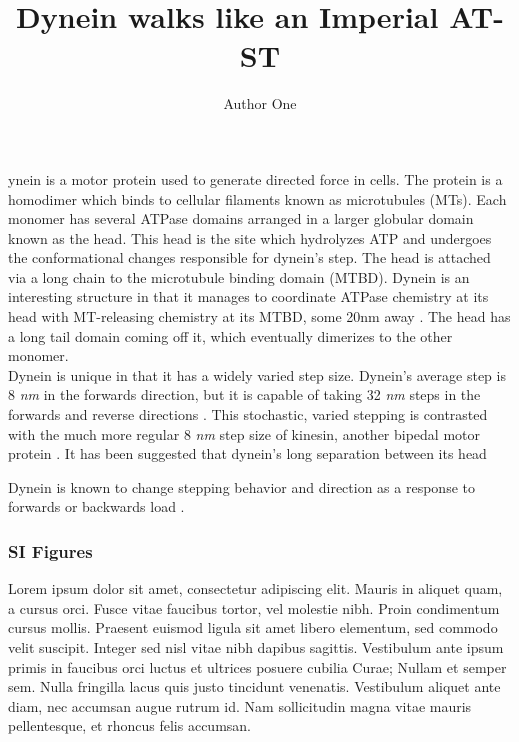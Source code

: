 \documentclass[9pt,twocolumn,twoside,lineno]{pnas-new}
\title{Dynein walks like an Imperial AT-ST}
\author[a,c,1]{Author One}
\affil[a]{Oregon State University}
\begin{document}
\verticaladjustment{-2pt}

\maketitle
\thispagestyle{firststyle}

ynein is a motor protein used to generate directed force in cells. The protein is a homodimer which binds to cellular filaments known as microtubules (MTs). Each monomer has several ATPase domains arranged in a larger globular domain known as the head. This head is the site which hydrolyzes ATP and undergoes the conformational changes responsible for dynein's step. The head is attached via a long chain to the microtubule binding domain (MTBD). Dynein is an interesting structure in that it manages to coordinate ATPase chemistry at its head with MT-releasing chemistry at its MTBD, some 20nm away \cite{mt-atp-coupling}. The head has a long tail domain coming off it, which eventually dimerizes to the other monomer.\\

Dynein is unique in that it has a widely varied step size. Dynein's average step is 8 \textit{nm} in the forwards direction, but it is capable of taking 32 \textit{nm} steps in the forwards and reverse directions \cite{weihongpaper} \cite{yildizpaper}. This stochastic, varied stepping is contrasted with the much more regular 8 \textit{nm} step size of kinesin, another bipedal motor protein \cite{kinesin-step-size}. It has been suggested that dynein's long separation between its head


Dynein is known to change stepping behavior and direction as a response to forwards or backwards load \cite{responsetoload}.


\subsubsection*{SI Figures}

Lorem ipsum dolor sit amet, consectetur adipiscing elit. Mauris in aliquet quam, a cursus orci. Fusce vitae faucibus tortor, vel molestie nibh. Proin condimentum cursus mollis. Praesent euismod ligula sit amet libero elementum, sed commodo velit suscipit. Integer sed nisl vitae nibh dapibus sagittis. Vestibulum ante ipsum primis in faucibus orci luctus et ultrices posuere cubilia Curae; Nullam et semper sem. Nulla fringilla lacus quis justo tincidunt venenatis. Vestibulum aliquet ante diam, nec accumsan augue rutrum id. Nam sollicitudin magna vitae mauris pellentesque, et rhoncus felis accumsan.\\
\end{document}
